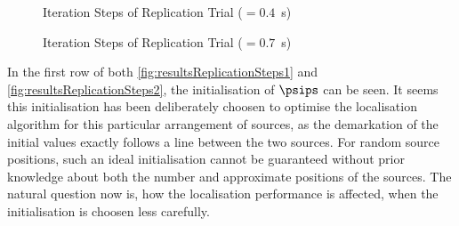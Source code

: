 \begin{figure}[!p]
	\iftoggle{quick}{%
		\texttt{[image: plots/schwartz2014/s=2-sloc=schwartz2014-T60=0.4-prior=schwartz2014-overview-sc]}
	}{%
		\setlength{\figurewidth}{\textwidth}
		\setlength{\figureheight}{0.3\textheight}
		
	}
    \caption[ Iteration Steps of Replication Trial]{ Iteration Steps of Replication Trial (\Tsixty$=0.4$~s)}
    \label{fig:resultsReplicationSteps1}
\end{figure}
\newpage

\clearpage
\begin{figure}[!p]
	\iftoggle{quick}{%
		\texttt{[image: plots/schwartz2014/s=2-sloc=schwartz2014-T60=0.7-prior=schwartz2014-overview-sc]}
	}{%
		\setlength{\figurewidth}{\textwidth}
		\setlength{\figureheight}{0.3\textheight}
		
	}
    \caption[ Iteration Steps of Replication Trial]{ Iteration Steps of Replication Trial (\Tsixty$=0.7$~s)}
    \label{fig:resultsReplicationSteps2}
\end{figure}

\FloatBarrier

In the first row of both \autoref{fig:resultsReplicationSteps1} and \autoref{fig:resultsReplicationSteps2}, the initialisation of $\psips$ can be seen. It seems this initialisation has been deliberately choosen to optimise the localisation algorithm for this particular arrangement of sources, as the demarkation of the initial values exactly follows a line between the two sources. For random source positions, such an ideal initialisation cannot be guaranteed without prior knowledge about both the number and approximate positions of the sources. The natural question now is, how the localisation performance is affected, when the initialisation is choosen less carefully.